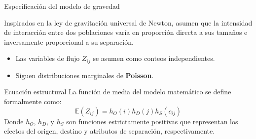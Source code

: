 \documentclass[10pt]{beamer}
\begin{document}
    \begin{frame}{Especificación del modelo de gravedad}
        \justifying
        
        Inspirados en la ley de gravitación universal de Newton, asumen que la intensidad de interacción entre dos poblaciones varía en proporción directa a sus tamaños e inversamente proporcional a su separación.
        
        \begin{itemize}
            \item Las variables de flujo $Z_{ij}$ se asumen como conteos independientes.
            \item Siguen distribuciones marginales de \textbf{Poisson}.
        \end{itemize}

        \begin{block}{Ecuación estructural}
            La función de media del modelo matemático se define formalmente como:
            \begin{equation}
                \mathbb{E}(Z_{ij}) = h_O(i) h_D(j) h_S(c_{ij})
            \end{equation}
            Donde $h_O$, $h_D$, y $h_S$ son funciones estrictamente positivas que representan los efectos del origen, destino y atributos de separación, respectivamente.
        \end{block}
    \end{frame}
\end{document}

